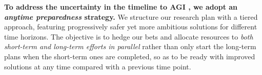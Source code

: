 \textbf{To address the uncertainty in the timeline to AGI \cite{epoch.ai.blog.literature.review.of.transformative.artificial.intelligence.timelines,www.gov.uk.government.publications.international.ai.safety.report.2025}, we adopt an \emph{anytime preparedness} strategy.} We structure our research plan with a tiered approach, featuring progressively safer yet more ambitious solutions for different time horizons. The objective is to hedge our bets and allocate resources to \emph{both short-term and long-term efforts in parallel} rather than only start the long-term plans when the short-term ones are completed, so as to be ready with improved solutions at any time compared with a previous time point.